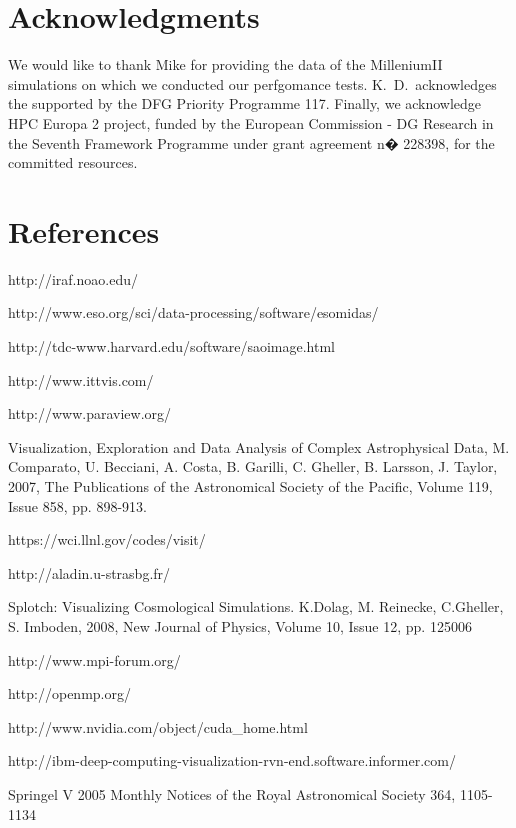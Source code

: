 \section*{Acknowledgments}
We would like to thank Mike for providing the data of the MilleniumII simulations 
on which we conducted our perfgomance tests. K.~D.~acknowledges the
supported by the DFG Priority Programme 117. Finally, we acknowledge 
HPC Europa 2 project, funded by the European Commission - 
DG Research in the Seventh Framework Programme under grant agreement n� 228398, 
for the committed resources.

\section*{References}


\begin{thebibliography}{00}








 http://iraf.noao.edu/

 http://www.eso.org/sci/data-processing/software/esomidas/

 http://tdc-www.harvard.edu/software/saoimage.html

 http://www.ittvis.com/

 http://www.paraview.org/

Visualization, Exploration and Data Analysis of Complex Astrophysical Data,
M. Comparato, U. Becciani, A. Costa, B. Garilli, C. Gheller, B. Larsson, J. Taylor, 2007, 
The Publications of the Astronomical Society of the Pacific, Volume 119, Issue 858, pp. 898-913.

 https://wci.llnl.gov/codes/visit/

 http://aladin.u-strasbg.fr/

Splotch: Visualizing Cosmological Simulations. K.Dolag, 
M. Reinecke, C.Gheller, S. Imboden, 2008, New Journal of Physics, Volume 10, Issue 12, pp. 125006

 http://www.mpi-forum.org/

 http://openmp.org/

 http://www.nvidia.com/object/cuda\_home.html

 http://ibm-deep-computing-visualization-rvn-end.software.informer.com/

 Springel V 2005 Monthly Notices of the Royal Astronomical Society 364, 1105-1134


\end{thebibliography}



